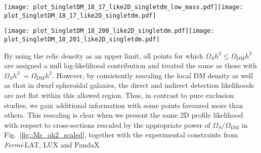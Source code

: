 \documentclass{PoS}
\newcommand{\sss}{\scriptscriptstyle}
\newcommand{\ms}{m_{\sss S}}
\newcommand{\lhs}{\lambda_{h\sss S}}
\begin{document}
\begin{figure*}[h!]
\centering
\texttt{[image: plot\_SingletDM\_18\_17\_like2D\_singletdm\_low\_mass.pdf]}\texttt{[image: plot\_SingletDM\_18\_17\_like2D\_singletdm.pdf]}
\caption{Profile likelihoods for the scalar singlet model, in the plane of the parameters $\lhs$ and $\ms$.  The white contours indicate the $1\sigma$ and $2\sigma$ confidence regions.  The left panel is focused on the low mass resonance region, while the right shows the full parameter range.  The white star indicates the best-fit (maximum likelihood) point.  The orange lines indicate edges of the allowed region where $S$ constitutes 100\% of dark matter.  Figures from \cite{Athron:2017kgt}.}
\label{fig::Ms_lhs}
\end{figure*}
\begin{figure*}[h!]
\centering
\texttt{[image: plot\_SingletDM\_18\_200\_like2D\_singletdm.pdf]}\texttt{[image: plot\_SingletDM\_18\_201\_like2D\_singletdm.pdf]}
\caption{Profile likelihoods of nuclear scattering (\textit{left}) and annihilation (\textit{right}) cross-sections for the scalar singlet model, scaled for the singlet relic abundance and plotted as a function of the singlet mass.  Here we rescale the nuclear and annihilation scattering cross-sections by $f\equiv\Omega_{\sss S} / \Omega_\text{DM}$ and $f^2$, in line with the linear and quadratic dependence, respectively, of scattering and annihilation rates on the dark matter density.  Contour lines indicate the $1\sigma$ and $2\sigma$ confidence regions.  The best-fit (maximum likelihood) point is indicated with a white star. Figures from \cite{Athron:2017kgt}.}
\label{fig::Ms_oh2_scaled}
\end{figure*}

By using the relic density as an upper limit, all points for which $\Omega_{\sss S}h^2\leq\Omega_\text{DM} h^2$ are assigned a null log-likelihood contribution and treated the same as those with $\Omega_{\sss S}h^2\ =\Omega_\text{DM} h^2$.  However, by consistently rescaling the local DM density as well as that in dwarf spheroidal galaxies, the direct and indirect detection likelihoods are not flat within this allowed region.  Thus, in contrast to pure exclusion studies, we gain additional information with some points favoured more than others.  This rescaling is clear when we present the same 2D profile likelihood with respect to cross-sections rescaled by the appropriate power of $\Omega_{\sss S} / \Omega_\text{DM}$ in Fig.~\ref{fig::Ms_oh2_scaled}, together with the experimental constraints from \textit{Fermi}-LAT, LUX and PandaX.
\end{document}
